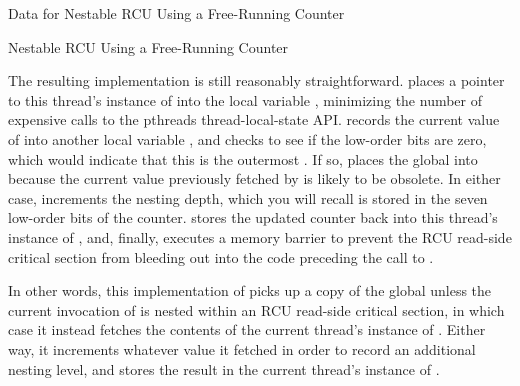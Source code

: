 \begin{listing}

\caption{Data for Nestable RCU Using a Free-Running Counter}
\label{lst:app:toyrcu:Data for Nestable RCU Using a Free-Running Counter}
\end{listing}

\begin{listing}
\vspace*{-11pt}
\caption{Nestable RCU Using a Free-Running Counter}
\label{lst:app:toyrcu:Nestable RCU Using a Free-Running Counter}
\end{listing}

\begin{fcvref}
The resulting  implementation is still reasonably
straightforward.
 places a pointer to
this thread's instance of 
into the local variable , minimizing the number of expensive
calls to the pthreads thread-local-state API\@.
 records the current value of 
into another local variable , and  checks
to see if the low-order bits are zero, which would indicate that
this is the outermost .
If so,  places the global 
into  because the current value previously fetched by
 is likely to be obsolete.
In either case,  increments the nesting depth,
which you will recall is stored in the seven low-order bits of the counter.
 stores the updated counter back into this thread's
instance of , and,
finally,  executes a memory barrier
to prevent the RCU read-side critical section from bleeding out
into the code preceding the call to .
\end{fcvref}

In other words, this implementation of  picks up a copy
of the global  unless the current invocation of
 is nested within an RCU read-side critical section,
in which case it instead fetches the contents of the current thread's
instance of .
Either way, it increments whatever value it fetched in order to record
an additional nesting level, and stores the result in the current
thread's instance of .

